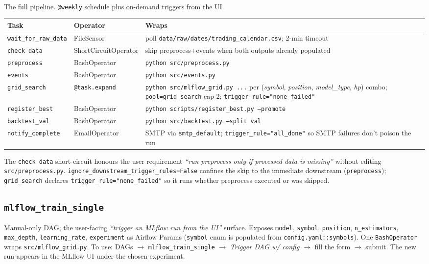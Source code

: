 \documentclass[11pt,a4paper]{article}
\begin{document}
The full pipeline. \texttt{@weekly} schedule plus on-demand triggers from the UI.

\begin{tabularx}{\linewidth}{@{}llX@{}}
\toprule
\textbf{Task} & \textbf{Operator} & \textbf{Wraps} \\
\midrule
\texttt{wait\_for\_raw\_data}  & FileSensor                & poll \texttt{data/raw/dates/trading\_calendar.csv}; 2-min timeout \\
\texttt{check\_data}           & ShortCircuitOperator      & skip preprocess+events when both outputs already populated \\
\texttt{preprocess}            & BashOperator              & \texttt{python src/preprocess.py} \\
\texttt{events}                & BashOperator              & \texttt{python src/events.py} \\
\texttt{grid\_search}          & \texttt{@task.expand}     & \texttt{python src/mlflow\_grid.py ...} per (\emph{symbol}, \emph{position}, \emph{model\_type}, \emph{hp}) combo; \texttt{pool=grid\_search} cap 2; \texttt{trigger\_rule="none\_failed"} \\
\texttt{register\_best}        & BashOperator              & \texttt{python scripts/register\_best.py --promote} \\
\texttt{backtest\_val}         & BashOperator              & \texttt{python src/backtest.py --split val} \\
\texttt{notify\_complete}      & EmailOperator             & SMTP via \texttt{smtp\_default}; \texttt{trigger\_rule="all\_done"} so SMTP failures don't poison the run \\
\bottomrule
\end{tabularx}

The \texttt{check\_data} short-circuit honours the user requirement \emph{``run preprocess only if processed data is missing''} without editing \texttt{src/preprocess.py}. \texttt{ignore\_downstream\_trigger\_rules=False} confines the skip to the immediate downstream (\texttt{preprocess}); \texttt{grid\_search} declares \texttt{trigger\_rule="none\_failed"} so it runs whether preprocess executed or was skipped.

\subsection{\texttt{mlflow\_train\_single}}

Manual-only DAG; the user-facing \emph{``trigger an MLflow run from the UI''} surface. Exposes \texttt{model}, \texttt{symbol}, \texttt{position}, \texttt{n\_estimators}, \texttt{max\_depth}, \texttt{learning\_rate}, \texttt{experiment} as Airflow Params (\texttt{symbol} enum is populated from \texttt{config.yaml::symbols}). One \texttt{BashOperator} wraps \texttt{src/mlflow\_grid.py}. To use: DAGs $\to$ \texttt{mlflow\_train\_single} $\to$ \emph{Trigger DAG w/ config} $\to$ fill the form $\to$ submit. The new run appears in the MLflow UI under the chosen experiment.
\end{document}
